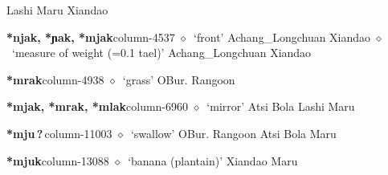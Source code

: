          Lashi 
\hspace{1ex}
         Maru 
\hspace{1ex}
         Xiandao 
  \item {\footnotesize \textbf{*njak, *ɲak, *mjak}}{\tiny column-4537}
         $\diamond$~`front'
         Achang\_Longchuan 
\hspace{1ex}
         Xiandao 
\hspace{1ex}
         $\diamond$~`measure of weight (=0.1 tael)'
         Achang\_Longchuan 
\hspace{1ex}
         Xiandao 
  \item {\footnotesize \textbf{*mrak}}{\tiny column-4938}
         $\diamond$~`grass'
         OBur. 
\hspace{1ex}
         Rangoon 
  \item {\footnotesize \textbf{*mjak, *mrak, *mlak}}{\tiny column-6960}
         $\diamond$~`mirror'
         Atsi 
\hspace{1ex}
         Bola 
\hspace{1ex}
         Lashi 
\hspace{1ex}
         Maru 
  \item {\footnotesize \textbf{*mju\,?\,}}{\tiny column-11003}
         $\diamond$~`swallow'
         OBur. 
\hspace{1ex}
         Rangoon 
\hspace{1ex}
         Atsi 
\hspace{1ex}
         Bola 
\hspace{1ex}
         Maru 
  \item {\footnotesize \textbf{*mjuk}}{\tiny column-13088}
         $\diamond$~`banana (plantain)'
         Xiandao 
\hspace{1ex}
         Maru 
\hspace{1ex}
